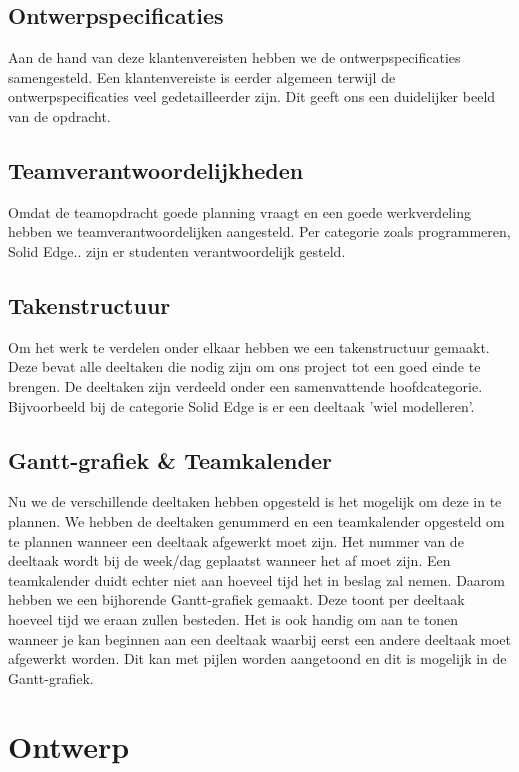 \documentclass[a4paper,twoside,kulak]{kulakreport}
\begin{document}
	\section{Ontwerpspecificaties}Aan de hand van deze klantenvereisten hebben we de ontwerpspecificaties samengesteld. Een klantenvereiste is eerder algemeen terwijl de ontwerpspecificaties veel gedetailleerder zijn. Dit geeft ons een duidelijker beeld van de opdracht. 
	\section{Teamverantwoordelijkheden}Omdat de teamopdracht goede planning vraagt en een goede werkverdeling hebben we teamverantwoordelijken aangesteld. Per categorie zoals programmeren, Solid Edge.. zijn er studenten verantwoordelijk gesteld. 
	\section{Takenstructuur}Om het werk te verdelen onder elkaar hebben we een takenstructuur gemaakt. Deze bevat alle deeltaken die nodig zijn om ons project tot een goed einde te brengen. De deeltaken zijn verdeeld onder een samenvattende hoofdcategorie. Bijvoorbeeld bij de categorie Solid Edge is er een deeltaak 'wiel modelleren'. 
	\section{Gantt-grafiek \& Teamkalender} Nu we de verschillende deeltaken hebben opgesteld is het mogelijk om deze in te plannen. We hebben de deeltaken genummerd en een teamkalender opgesteld om te plannen wanneer een deeltaak afgewerkt moet zijn. Het nummer van de deeltaak wordt bij de week/dag geplaatst wanneer het af moet zijn. Een teamkalender duidt echter niet aan hoeveel tijd het in beslag zal nemen. Daarom hebben we een bijhorende Gantt-grafiek gemaakt. Deze toont per deeltaak hoeveel tijd we eraan zullen besteden. Het is ook handig om aan te tonen wanneer je kan beginnen aan een deeltaak waarbij eerst een andere deeltaak moet afgewerkt worden. Dit kan met pijlen worden aangetoond en dit is mogelijk in de Gantt-grafiek. 
	
	\chapter{Ontwerp}
\end{document}
